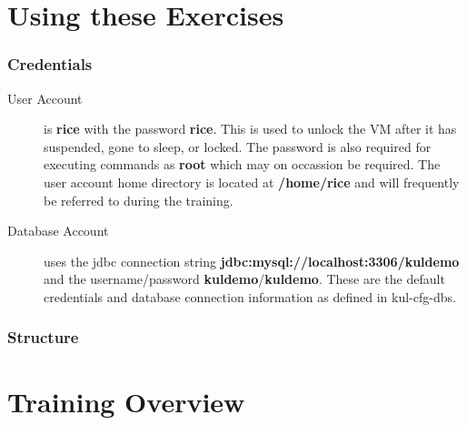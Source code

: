 \documentclass[letterpaper,notitlepage,12pt]{book}
\begin{document}
\section*{Using these Exercises}


\subsubsection*{Credentials}
\begin{description}
\item [User Account] is \textbf{rice} with the password
  \textbf{rice}. This is used to unlock the VM after it has suspended,
  gone to sleep, or locked. The password is also required for
  executing commands as \textbf{root} which may on occassion be
  required. The user account home directory is located at
  \textbf{/home/rice} and will frequently be referred to during the training.
\item [Database Account] uses the jdbc connection string
  \textbf{jdbc:mysql://localhost:3306/kuldemo} and the
  username/password \textbf{kuldemo}/\textbf{kuldemo}. These are the
  default credentials and database connection information as defined
  in kul-cfg-dbs.
\end{description}

\subsubsection*{Structure}

\section*{Training Overview}




\end{document}
